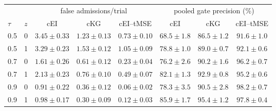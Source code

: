 \begin{tabular}{@{}llcccccc@{}}
\toprule
 & & \multicolumn{3}{c}{false admissions/trial} & \multicolumn{3}{c}{pooled gate precision (\%)} \\
\cmidrule(lr){3-5}\cmidrule(lr){6-8}
$\tau$ & $z$ & cEI & cKG & cEI--tMSE & cEI & cKG & cEI--tMSE \\
\midrule
0.5 & 0 & $3.45{\pm}0.33$ & $1.23{\pm}0.13$ & $0.73{\pm}0.10$ & $68.5{\pm}1.8$ & $86.5{\pm}1.2$ & $91.6{\pm}1.0$ \\
0.5 & 1 & $3.29{\pm}0.23$ & $1.53{\pm}0.12$ & $1.05{\pm}0.09$ & $78.8{\pm}1.0$ & $89.0{\pm}0.7$ & $92.1{\pm}0.6$ \\
0.7 & 0 & $1.61{\pm}0.26$ & $0.61{\pm}0.12$ & $0.23{\pm}0.04$ & $76.2{\pm}2.6$ & $90.2{\pm}1.6$ & $96.2{\pm}0.7$ \\
0.7 & 1 & $2.13{\pm}0.23$ & $0.76{\pm}0.10$ & $0.49{\pm}0.07$ & $82.1{\pm}1.3$ & $92.9{\pm}0.8$ & $95.2{\pm}0.6$ \\
0.9 & 0 & $0.91{\pm}0.22$ & $0.36{\pm}0.12$ & $0.06{\pm}0.02$ & $78.3{\pm}3.5$ & $90.5{\pm}2.8$ & $98.2{\pm}0.7$ \\
0.9 & 1 & $0.98{\pm}0.17$ & $0.30{\pm}0.09$ & $0.12{\pm}0.03$ & $85.9{\pm}1.7$ & $95.4{\pm}1.2$ & $97.8{\pm}0.4$ \\
\bottomrule
\end{tabular}
